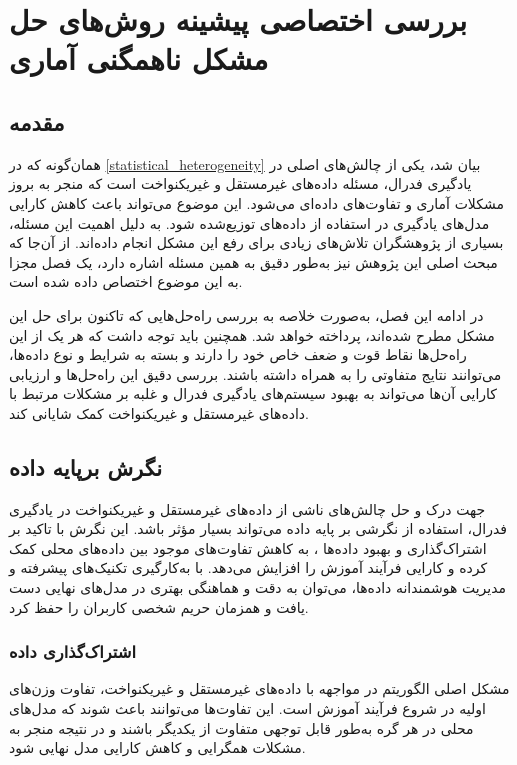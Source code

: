 \chapter{بررسی اختصاصی پیشینه روش‌های حل مشکل ناهمگنی آماری}

\section{مقدمه}
همان‌گونه که در
\ref{statistical_heterogeneity}
بیان شد،
یکی از چالش‌های اصلی در یادگیری فدرال، مسئله داده‌های غیرمستقل و غیریکنواخت
است که منجر به بروز مشکلات آماری و تفاوت‌های داده‌ای می‌شود. این موضوع می‌تواند باعث کاهش کارایی مدل‌های یادگیری در استفاده از داده‌های توزیع‌شده شود. به دلیل اهمیت این مسئله، بسیاری از پژوهشگران تلاش‌های زیادی برای رفع این مشکل انجام داده‌اند.
از آن‌جا که مبحث اصلی این پژوهش نیز به‌طور دقیق به همین مسئله اشاره دارد، یک فصل مجزا به این موضوع اختصاص داده شده است.

در ادامه این فصل، به‌صورت خلاصه به بررسی راه‌حل‌هایی که تاکنون برای حل این مشکل مطرح شده‌اند، پرداخته خواهد شد. همچنین باید توجه داشت که هر یک از این راه‌حل‌ها نقاط قوت و ضعف خاص خود را دارند و بسته به شرایط و نوع داده‌ها، می‌توانند نتایج متفاوتی را به همراه داشته باشند. بررسی دقیق این راه‌حل‌ها و ارزیابی کارایی آن‌ها می‌تواند به بهبود سیستم‌های یادگیری فدرال و غلبه بر مشکلات مرتبط با داده‌های غیرمستقل و غیریکنواخت کمک شایانی کند.

\section{نگرش برپایه داده}
جهت درک و حل چالش‌های ناشی از داده‌های غیرمستقل و غیریکنواخت در یادگیری فدرال، استفاده از نگرشی بر پایه داده می‌تواند بسیار مؤثر باشد. این نگرش با تاکید بر اشتراک‌گذاری و بهبود داده‌ها%
%
، به کاهش تفاوت‌های موجود بین داده‌های محلی کمک کرده و کارایی فرآیند آموزش را افزایش می‌دهد. با به‌کارگیری تکنیک‌های پیشرفته و مدیریت هوشمندانه داده‌ها، می‌توان به دقت و هماهنگی بهتری در مدل‌های نهایی دست یافت و همزمان حریم شخصی کاربران را حفظ کرد.

\subsection{اشتراک‌گذاری داده}
مشکل اصلی الگوریتم
در مواجهه با داده‌های غیرمستقل و غیریکنواخت، تفاوت وزن‌های اولیه در شروع فرآیند آموزش است. این تفاوت‌ها می‌توانند باعث شوند که مدل‌های محلی در هر گره به‌طور قابل توجهی متفاوت از یکدیگر باشند و در نتیجه منجر به مشکلات همگرایی و کاهش کارایی مدل نهایی ‌شود.

